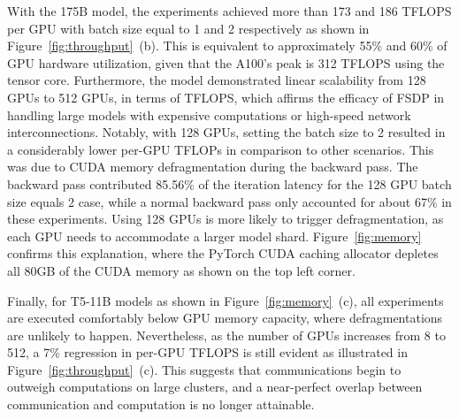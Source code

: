 With the 175B model, the experiments achieved more than 173 and 186 TFLOPS per GPU with batch size equal to 1 and 2 respectively as shown in Figure~\ref{fig:throughput}~(b). This is equivalent to approximately 55\% and 60\% of GPU hardware utilization, given that the A100's peak is 312 TFLOPS using the  tensor core. Furthermore, the model demonstrated linear scalability from 128 GPUs to 512 GPUs, in terms of TFLOPS, which affirms the efficacy of FSDP in handling large models with expensive computations or high-speed network interconnections. Notably, with 128 GPUs, setting the batch size to 2 resulted in a considerably lower per-GPU TFLOPs in comparison to other scenarios. This was due to CUDA memory defragmentation during the backward pass. The backward pass contributed 85.56\% of the iteration latency for the 128 GPU batch size equals 2 case, while a normal backward pass only accounted for about 67\% in these experiments. Using 128 GPUs is more likely to trigger defragmentation, as each GPU needs to accommodate a larger model shard. Figure~\ref{fig:memory} confirms this explanation, where the PyTorch CUDA caching allocator depletes all 80GB of the CUDA memory as shown on the top left corner. 


Finally, for T5-11B models as shown in Figure~\ref{fig:memory}~(c), all experiments are executed comfortably below GPU memory capacity, where defragmentations are unlikely to happen. Nevertheless, as the number of GPUs increases from 8 to 512, a 7\% regression in per-GPU TFLOPS is still evident as illustrated in Figure~\ref{fig:throughput}~(c). This suggests that communications begin to outweigh computations on large clusters, and a near-perfect overlap between communication and computation is no longer attainable.
